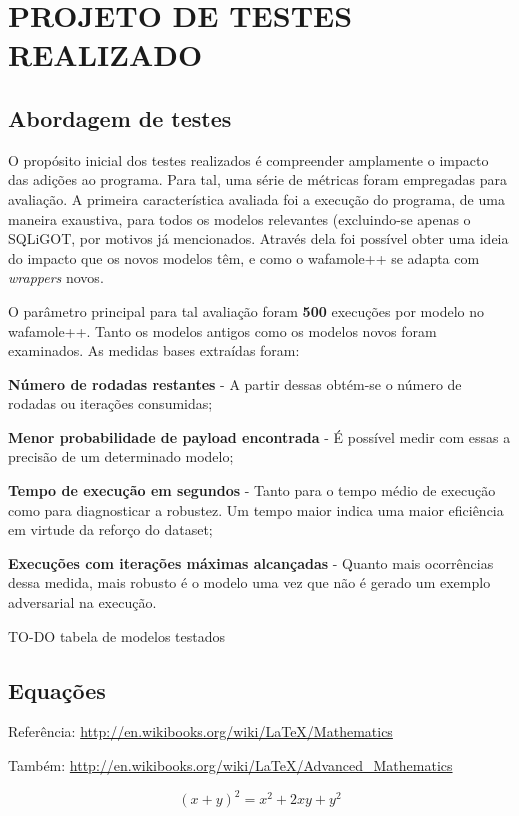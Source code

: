 \chapter{PROJETO DE TESTES REALIZADO}
\label{chp:capitulo5}

\section{Abordagem de testes}
O propósito inicial dos testes realizados é compreender amplamente o impacto das adições ao programa. Para tal, uma série de métricas foram empregadas para avaliação. A primeira característica avaliada foi a execução do programa, de uma maneira exaustiva, para todos os modelos relevantes (excluindo-se apenas o SQLiGOT, por motivos já mencionados. Através dela foi possível obter uma ideia do impacto que os novos modelos têm, e como o wafamole++ se adapta com \textit{wrappers} novos.

O parâmetro principal para tal avaliação foram \textbf{500} execuções por modelo no wafamole++. Tanto os modelos antigos como os modelos novos foram examinados. As medidas bases extraídas foram:
\begin{alineas}
\item \textbf{Número de rodadas restantes} - A partir dessas obtém-se o número de rodadas ou iterações consumidas;
\item \textbf{Menor probabilidade de payload encontrada} - É possível medir com essas a precisão de um determinado modelo;
\item \textbf{Tempo de execução em segundos} - Tanto para o tempo médio de execução como para diagnosticar a robustez. Um tempo maior indica uma maior eficiência em virtude da reforço do dataset;
\item \textbf{Execuções com iterações máximas alcançadas} - Quanto mais ocorrências dessa medida, mais robusto é o modelo uma vez que não é gerado um exemplo adversarial na execução.
\end{alineas}

TO-DO tabela de modelos testados


\section{Equações}
\label{sec:equacoes}
Referência: \url{http://en.wikibooks.org/wiki/LaTeX/Mathematics}

Também: \url{http://en.wikibooks.org/wiki/LaTeX/Advanced_Mathematics}

\begin{equation}
  (x + y)^2 = x^2 + 2xy + y^2
  \label{eq:equacao1}
\end{equation}

